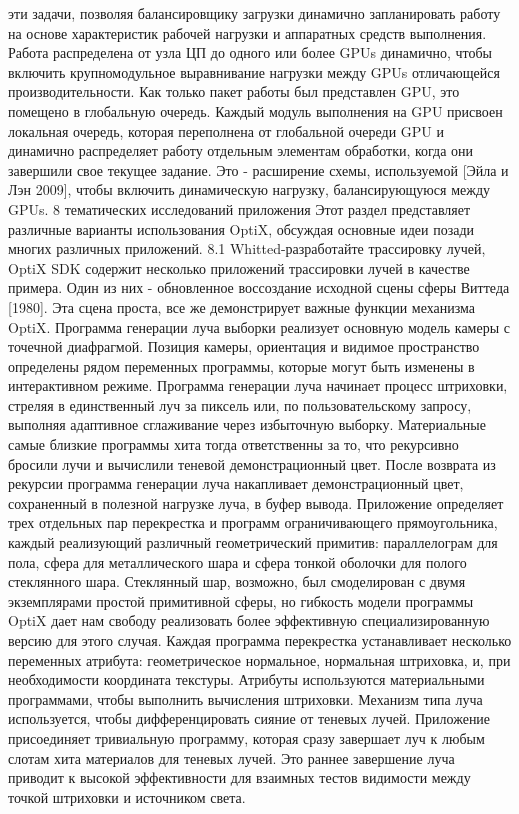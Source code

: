 эти задачи, позволяя балансировщику загрузки динамично запланировать работу на основе характеристик рабочей нагрузки и аппаратных средств выполнения.
Работа распределена от узла ЦП до одного или более GPUs динамично, чтобы включить крупномодульное выравнивание нагрузки между GPUs отличающейся производительности. Как только пакет работы был представлен GPU, это помещено в глобальную очередь. Каждый модуль выполнения на GPU присвоен локальная очередь, которая переполнена от глобальной очереди GPU и динамично распределяет работу отдельным элементам обработки, когда они завершили свое текущее задание. Это - расширение схемы, используемой [Эйла и Лэн 2009], чтобы включить динамическую нагрузку, балансирующуюся между GPUs.
8 тематических исследований приложения
Этот раздел представляет различные варианты использования OptiX, обсуждая основные идеи позади многих различных приложений.
8.1 Whitted-разработайте трассировку лучей, OptiX SDK содержит несколько приложений трассировки лучей в качестве примера. Один из них - обновленное воссоздание исходной сцены сферы Виттеда [1980]. Эта сцена проста, все же демонстрирует важные функции механизма OptiX.
Программа генерации луча выборки реализует основную модель камеры с точечной диафрагмой. Позиция камеры, ориентация и видимое пространство определены рядом переменных программы, которые могут быть изменены в интерактивном режиме. Программа генерации луча начинает процесс штриховки, стреляя в единственный луч за пиксель или, по пользовательскому запросу, выполняя адаптивное сглаживание через избыточную выборку. Материальные самые близкие программы хита тогда ответственны за то, что рекурсивно бросили лучи и вычислили теневой демонстрационный цвет. После возврата из рекурсии программа генерации луча накапливает демонстрационный цвет, сохраненный в полезной нагрузке луча, в буфер вывода.
Приложение определяет трех отдельных пар перекрестка и программ ограничивающего прямоугольника, каждый реализующий различный геометрический примитив: параллелограм для пола, сфера для металлического шара и сфера тонкой оболочки для полого стеклянного шара. Стеклянный шар, возможно, был смоделирован с двумя экземплярами простой примитивной сферы, но гибкость модели программы OptiX дает нам свободу реализовать более эффективную специализированную версию для этого случая. Каждая программа перекрестка устанавливает несколько переменных атрибута: геометрическое нормальное, нормальная штриховка, и, при необходимости координата текстуры. Атрибуты используются материальными программами, чтобы выполнить вычисления штриховки. Механизм типа луча используется, чтобы дифференцировать сияние от теневых лучей. Приложение присоединяет тривиальную программу, которая сразу завершает луч к любым слотам хита материалов для теневых лучей. Это раннее завершение луча приводит к высокой эффективности для взаимных тестов видимости между точкой штриховки и источником света.
